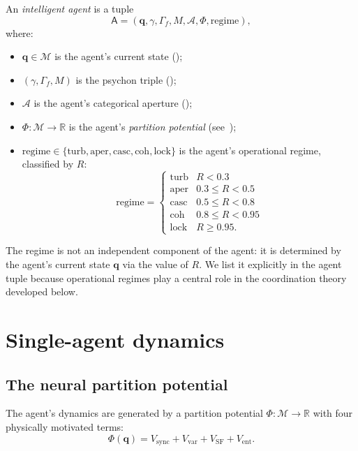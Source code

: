 \documentclass[11pt,twocolumn,a4paper]{article}
\newcommand{\R}{\mathbb{R}}
\newcommand{\M}{\mathcal{M}}
\newcommand{\Aper}{\mathcal{A}}
\newcommand{\agent}{\mathsf{A}}
\newcommand{\qvec}{\mathbf{q}}
\newcommand{\Pot}{\Phi}
\begin{document}
\begin{definition}\label{def:agent}
An \emph{intelligent agent} is a tuple
\[
\agent=(\qvec,\gamma,\Gamma_f,M,\Aper,\Pot,\text{regime}),
\]
where:
\begin{itemize}[leftmargin=*]
\item $\qvec\in\M$ is the agent's current state ();
\item $(\gamma,\Gamma_f,M)$ is the psychon triple ();
\item $\Aper$ is the agent's categorical aperture ();
\item $\Pot:\M\to\R$ is the agent's \emph{partition potential}
(see~);
\item $\mathrm{regime}\in\{\mathrm{turb},\mathrm{aper},\mathrm{casc},
\mathrm{coh},\mathrm{lock}\}$ is the agent's operational regime,
classified by $R$:
\[
\mathrm{regime}=\begin{cases}
\mathrm{turb} & R<0.3\\
\mathrm{aper} & 0.3\le R<0.5\\
\mathrm{casc} & 0.5\le R<0.8\\
\mathrm{coh} & 0.8\le R<0.95\\
\mathrm{lock} & R\ge 0.95.
\end{cases}
\]
\end{itemize}
\end{definition}

\begin{remark}\label{rem:regime-derived}
The regime is not an independent component of the agent: it is
determined by the agent's current state $\qvec$ via the value of $R$.
We list it explicitly in the agent tuple because operational regimes
play a central role in the coordination theory developed below.
\end{remark}

\section{Single-agent dynamics}
\label{sec:dynamics}

\subsection{The neural partition potential}

The agent's dynamics are generated by a partition potential
$\Pot:\M\to\R$ with four physically motivated terms:
\[
\Pot(\qvec)=V_{\mathrm{sync}}+V_{\mathrm{var}}+V_{\mathrm{SF}}+V_{\mathrm{ent}}.
\]
\end{document}
